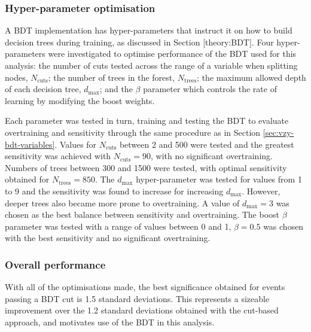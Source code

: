 \subsubsection{Hyper-parameter optimisation}

A \ac{BDT} implementation has hyper-parameters that instruct it on how to build
decision trees during training, as discussed in Section [theory:BDT].
\newcommand\ntrees{\ensuremath{N_\text{trees}}\xspace}
\newcommand\ncuts{\ensuremath{N_\text{cuts}}\xspace}
\newcommand\dmax{\ensuremath{d_\text{max}}\xspace}
\newcommand\boostbeta{\ensuremath{\beta}\xspace}
Four hyper-parameters were investigated to optimise performance of the \ac{BDT}
used for this analysis: the number of cuts tested across the range of a variable
when splitting nodes, \ncuts; the number of trees in the forest, \ntrees; the
maximum allowed depth of each decision tree, \dmax; and the \boostbeta
parameter which controls the rate of learning by modifying the boost weights.

Each parameter was tested in turn, training and testing the \ac{BDT} to evaluate
overtraining and sensitivity through the same procedure as in Section
\ref{sec:vzy-bdt-variables}. Values for \ncuts between 2 and 500 were tested and
the greatest sensitivity was achieved with $\ncuts=90$, with no significant
overtraining. Numbers of trees between 300 and 1500 were tested, with optimal
sensitivity obtained for $\ntrees=850$. The \dmax hyper-parameter was tested
for values from 1 to 9 and the sensitivity was found to increase for increasing
\dmax. However, deeper trees also became more prone to overtraining. A value
of $\dmax=3$ was chosen as the best balance between sensitivity and
overtraining. The boost \boostbeta parameter was tested with a range of values
between 0 and 1, $\boostbeta=0.5$ was chosen with the best sensitivity and no
significant overtraining.

\subsubsection{Overall performance}

With all of the optimisations made, the best significance obtained for events
passing a \ac{BDT} cut is 1.5 standard deviations. This represents a sizeable
improvement over the 1.2 standard deviations obtained with the cut-based
approach, and motivates use of the \ac{BDT} in this analysis.


